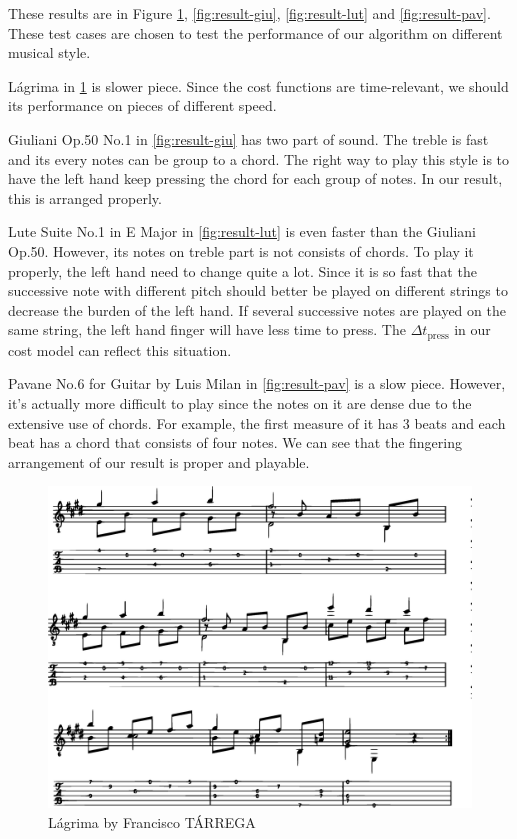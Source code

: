 These results are in Figure \ref{fig:result-lag}, \ref{fig:result-giu}, \ref{fig:result-lut} and \ref{fig:result-pav}.  These test cases are chosen to test the performance of our algorithm on different musical style.

Lágrima in \ref{fig:result-lag} is slower piece. Since the cost functions are time-relevant, we should its performance on pieces of different speed.

Giuliani Op.50 No.1 in \ref{fig:result-giu}  has two part of sound. The treble is fast and its every notes can be group to a chord. The right way to play this style is to have the left hand keep pressing the chord for each group of notes. In our result, this is arranged properly.

Lute Suite No.1 in E Major in \ref{fig:result-lut} is even faster than the Giuliani Op.50. However, its notes on treble part is not consists of chords. To play it properly, the left hand need to change quite a lot. Since it is so fast that the successive note with different pitch should better be played on different strings to decrease the burden of the left hand. If several successive notes are played on the same string, the left hand finger will have less time to press. The $\Delta t_\mathrm{press}$ in our cost model can reflect this situation.

Pavane No.6 for Guitar by Luis Milan in \ref{fig:result-pav} is a slow piece. However, it's actually more difficult to play since the notes on it are dense due to the extensive use of chords. For example, the first measure of it has 3 beats and each beat has a chord that consists of four notes. We can see that the fingering arrangement of our result is proper and playable.

\begin{figure}[h]
    \centering
    \includegraphics[width=1.0\textwidth]{Figures/Lag.eps}
    \caption{Lágrima by Francisco TÁRREGA}
    \label{fig:result-lag}
\end{figure}

